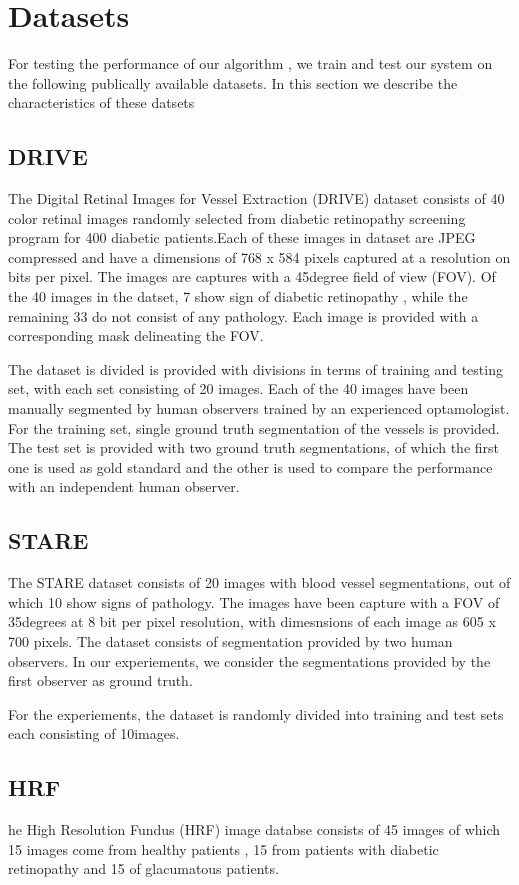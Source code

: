 \section{Datasets}
For testing the performance of our algorithm , we train and test our system on the following publically available datasets. In this section we describe the characteristics of these datsets

\subsection{DRIVE}
The Digital Retinal Images for Vessel Extraction (DRIVE) dataset consists of 40 color retinal images randomly selected from diabetic retinopathy screening program for 400 diabetic patients.Each of these images in dataset are JPEG compressed and have a dimensions of 768 x 584 pixels captured at a resolution on bits per pixel. The images are captures with a 45degree field of view (FOV).
Of the 40 images in the datset, 7 show sign of diabetic retinopathy , while the remaining 33 do not consist of any pathology. Each image is provided with a corresponding mask delineating the FOV.

The dataset is divided is provided with divisions in terms of training and testing set, with each set consisting of 20 images. Each of the 40 images have been manually segmented by human observers trained by an experienced optamologist. For the training set, single ground truth segmentation of the vessels is provided. The test set is provided with two ground truth segmentations, of which the first one is used as gold standard and the other is used to compare the performance with an independent human observer.

\subsection{STARE}
The STARE dataset consists of 20 images with blood vessel segmentations, out of which 10 show signs of pathology. The images have been capture with a FOV of 35degrees at 8 bit per pixel resolution, with dimesnsions of each image as 605 x 700 pixels. The dataset consists of segmentation provided by two human observers. In our experiements, we consider the segmentations provided by the first observer as ground truth.

For the experiements, the dataset is randomly divided into training and test sets each consisting of 10images.

\subsection{HRF}
he High Resolution Fundus (HRF) image databse consists of 45 images of which 15 images come from healthy patients , 15 from patients with diabetic retinopathy and 15 of glacumatous patients.

